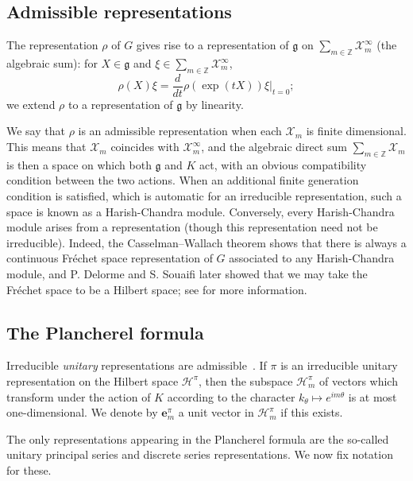 \documentclass[12pt,a4paper]{amsart}
\theoremstyle{definition}
\theoremstyle{remark}
\numberwithin{equation}{section}
\newcommand{\Z}{\mathbb{Z}}
\newcommand{\Hil}{\mathcal{H}}
\newcommand{\Ban}{\mathcal{X}}
\newcommand{\frk}[1]{\mathfrak{#1}}
\newcommand{\rep}{\rho}
\newcommand{\eb}{\mathbf{e}}
\begin{document}
\subsection*{Admissible representations}
The representation $\rep$ of $G$ gives rise to a representation of $\frk{g}$ on $\sum_{m\in\Z} \Ban_m^\infty$ (the algebraic sum): for $X \in \frk{g}$ and $\xi \in \sum_{m\in\Z} \Ban_m^\infty$,
\[
\rep(X)\xi = \frac{d}{dt} \rep(\exp(tX)) \xi |_{t=0} ;
\]
we extend $\rep$ to a representation of $\frk{g}$ by linearity.

We say that $\rep$ is an admissible representation when each $\Ban_m$ is finite dimensional. 
This means that $\Ban_m$ coincides with $\Ban_m^\infty$, and the algebraic direct sum $\sum_{m\in \Z} \Ban_m$ is then a space on which both $\frk{g}$ and $K$ act, with an obvious compatibility condition between the two actions.
When an additional finite generation condition is satisfied, which is automatic for an irreducible representation, such a space is known as a  Harish-Chandra module.
Conversely, every Harish-Chandra module arises from a representation (though this representation need not be irreducible).  
Indeed, the Casselman--Wallach theorem shows that there is always a continuous Fr\'echet space representation of $G$ associated to any Harish-Chandra module, and P. Delorme and S. Souaifi \cite{DS} later showed that we may take the Fr\'echet space to be a Hilbert space; see \cite{BeKr14} for more information.


\subsection*{The Plancherel formula}
Irreducible \emph{unitary} representations are admissible~\cite[\S 4.5]{War}. 
If $\pi$ is an irreducible unitary representation on the Hilbert space $\Hil^\pi$, then the subspace $\Hil^\pi_{m}$ of vectors which transform  under the action of $K$ according to the character $k_\theta\mapsto e^{im\theta}$ is at most one-dimensional. 
We denote by $\eb^\pi_{m}$ a unit vector in $\Hil^\pi_{m}$ if this exists. 


The only representations appearing in the Plancherel formula are the so-called unitary principal series and discrete series representations. We now fix notation for these. 
\end{document}

